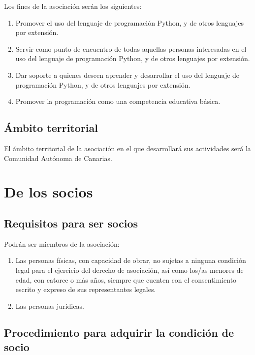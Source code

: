 \documentclass[a4paper, 12pt, oneside]{book}
\begin{document}
Los fines de la asociación serán los siguientes:

\begin{enumerate}
    \item Promover el uso del lenguaje de programación Python, y de otros lenguajes por extensión.
    \item Servir como punto de encuentro de todas aquellas personas interesadas en el uso del lenguaje de programación Python, y de otros lenguajes por extensión.
    \item Dar soporte a quienes deseen aprender y desarrollar el uso del lenguaje de programación Python, y de otros lenguajes por extensión.
    \item Promover la programación como una competencia educativa básica.
\end{enumerate}

\section{Ámbito territorial}

El ámbito territorial de la asociación en el que desarrollará sus actividades será la Comunidad Autónoma de Canarias.

\chapter{De los socios}

\section{Requisitos para ser socios}

Podrán ser miembros de la asociación:

\begin{enumerate}
    \item Las personas físicas, con capacidad de obrar, no sujetas a ninguna condición legal para el ejercicio del derecho de asociación, así como los/as menores de edad, con catorce o más años, siempre que cuenten con el consentimiento escrito y expreso de sus representantes legales.
    \item Las personas jurídicas.
\end{enumerate}

\section{Procedimiento para adquirir la condición de socio}
\end{document}
